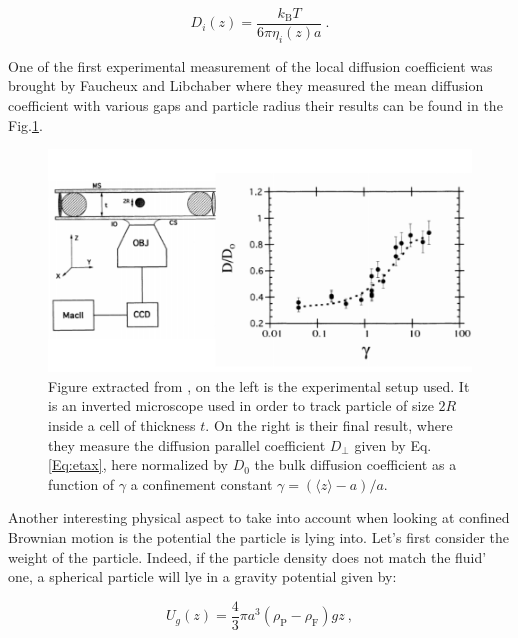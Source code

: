 \begin{equation}
	D_i (z) = \frac{k_\mathrm{B} T}{6\pi\eta_i (z) a}~.
\end{equation}

One of the first experimental measurement of the local diffusion coefficient was brought by Faucheux and Libchaber \cite{faucheux_confined_1994} where they measured the mean diffusion coefficient with various gaps and particle radius their results can be found in the Fig.\ref{fig:libchaber}.

\begin{figure}
	\centering
	\includegraphics{02_body/chapter1/image/libchaber.pdf}
	\caption{Figure extracted from \cite{faucheux_confined_1994}, on the left is the experimental setup used. It is an inverted microscope used in order to track particle of size $2R$ inside a cell of thickness $t$. On the right is their final result, where they measure the diffusion parallel coefficient $D_\bot$ given by Eq.\ref{Eq:etax}, here normalized by $D_0$ the bulk diffusion coefficient as a function of  $\gamma$ a confinement constant $\gamma = (\langle z \rangle -a)/a$. }
	\label{fig:libchaber}
\end{figure}

Another interesting physical aspect to take into account when looking at confined Brownian motion is the potential the particle is lying into. Let's first consider the weight of the particle. Indeed, if the particle density does not match the fluid' one, a spherical particle will lye in a gravity potential given by:

\begin{equation}
	U_g(z) = \frac{4}{3} \pi a^3 (\rho_\mathrm{P} - \rho_\mathrm{F})gz~,
\end{equation}


